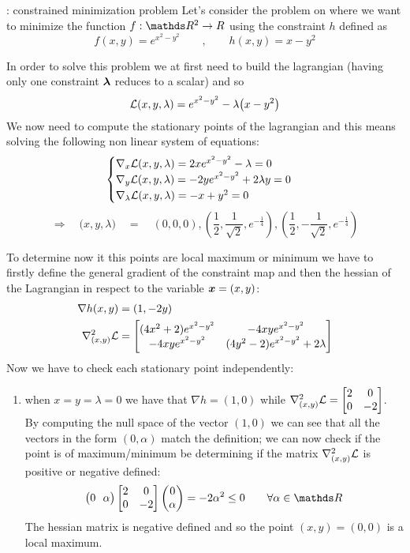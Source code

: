 	\begin{example}{: constrained minimization problem}
		Let's consider the problem on where we want to minimize the function $f:\R^2\rightarrow R$ using the constraint $h$ defined as
		\[ f(x,y) = e^{x^2-y^2} \qquad,\qquad h(x,y) = x - y^2 \]
		
		In order to solve this problem we at first need to build the lagrangian (having only one constraint $\boldsymbol{\lambda}$ reduces to a scalar) and so
		\[ \mathcal L(x,y,\lambda) = e^{x^2-y^2} - \lambda \big(x-y^2\big) \]
		We now need to compute the stationary points of the lagrangian and this means solving the following non linear system of equations:
		\[ \begin{cases}
			\nabla_x \mathcal L(x,y,\lambda) = 2 x e^{x^2-y^2} - \lambda = 0 \\
			\nabla_y \mathcal L(x,y,\lambda) = -2 y e^{x^2-y^2} + 2 \lambda y = 0 \\
			\nabla_\lambda \mathcal L(x,y,\lambda) = -x + y^2 = 0 	
		\end{cases} \]
		\[ \Rightarrow \quad \big(x,y,\lambda\big) \quad  = \quad \left(0,0,0\right) , \left(\frac 1 2 , \frac 1 {\sqrt 2},e ^{-\frac 14}\right), \left(\frac 1 2 , -\frac 1 {\sqrt 2},e ^{-\frac 14}\right)\]
		
		To determine now it this points are local maximum or minimum we have to firstly define the general gradient of the constraint map and then the hessian of the Lagrangian in respect to the variable $\boldsymbol{x} =(x,y)$:
		\begin{align*}
			\nabla h(x,y) & = (1,-2y) \\
			\nabla^2_{(x,y)} \mathcal L & = \begin{bmatrix}
				(4x^2+2)e^{x^2-y^2} & -4xy e^{x^2-y^2} \\
				-4xy e^{x^2-y^2} & (4y^2-2)e^{x^2-y^2} + 2\lambda
			\end{bmatrix}
		\end{align*}
		Now we have to check each stationary point independently:
		\begin{enumerate}
			\item when $x=y=\lambda = 0$ we have that $\nabla h = (1,0)$ while $\nabla^2_{(x,y)} \mathcal L = \begin{bmatrix} 2 & 0 \\ 0 & -2 \end{bmatrix}$. By computing the null space of the vector $(1,0)$ we can see that all the vectors in the form $(0,\alpha)$ match the definition; we can now check if the point is of maximum/minimum be determining if the matrix $\nabla^2_{(x,y)} \mathcal L$ is positive or negative defined:
			\[ \big(0 \ \ \alpha\big) \begin{bmatrix} 2 & 0 \\ 0 & -2 \end{bmatrix} \begin{pmatrix}
				0 \\ \alpha
			\end{pmatrix} = -2\alpha^2 \leq 0 \qquad \forall \alpha\in \R \]
			The hessian matrix is negative defined and so the point $(x,y) = (0,0)$ is a local maximum.
			

\end{enumerate}
\end{example}
